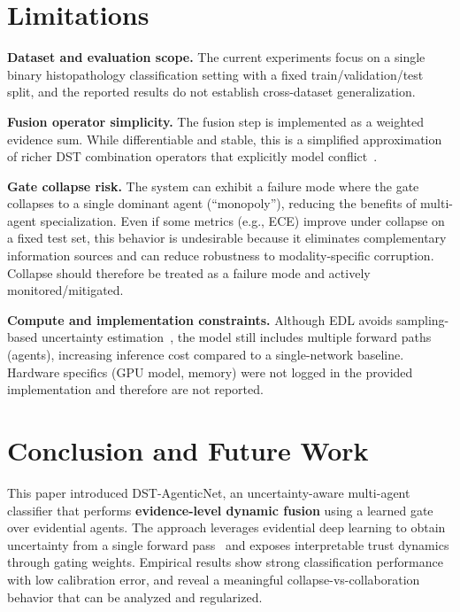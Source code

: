 \documentclass[10pt]{article}
\begin{document}
\section{Limitations}
\label{sec:limits}

\textbf{Dataset and evaluation scope.} The current experiments focus on a single binary histopathology classification setting with a fixed train/validation/test split, and the reported results do not establish cross-dataset generalization.

\textbf{Fusion operator simplicity.} The fusion step is implemented as a weighted evidence sum. While differentiable and stable, this is a simplified approximation of richer DST combination operators that explicitly model conflict~\cite{tong2021,yaghoubi2021}.

\textbf{Gate collapse risk.} The system can exhibit a failure mode where the gate collapses to a single dominant agent (``monopoly''), reducing the benefits of multi-agent specialization. Even if some metrics (e.g., ECE) improve under collapse on a fixed test set, this behavior is undesirable because it eliminates complementary information sources and can reduce robustness to modality-specific corruption. Collapse should therefore be treated as a failure mode and actively monitored/mitigated.

\textbf{Compute and implementation constraints.} Although EDL avoids sampling-based uncertainty estimation~\cite{sensoy2018}, the model still includes multiple forward paths (agents), increasing inference cost compared to a single-network baseline. Hardware specifics (GPU model, memory) were not logged in the provided implementation and therefore are not reported.

\section{Conclusion and Future Work}
\label{sec:conclusion}

This paper introduced DST-AgenticNet, an uncertainty-aware multi-agent classifier that performs \textbf{evidence-level dynamic fusion} using a learned gate over evidential agents. The approach leverages evidential deep learning to obtain uncertainty from a single forward pass~\cite{sensoy2018} and exposes interpretable trust dynamics through gating weights. Empirical results show strong classification performance with low calibration error, and reveal a meaningful collapse-vs-collaboration behavior that can be analyzed and regularized.
\end{document}
